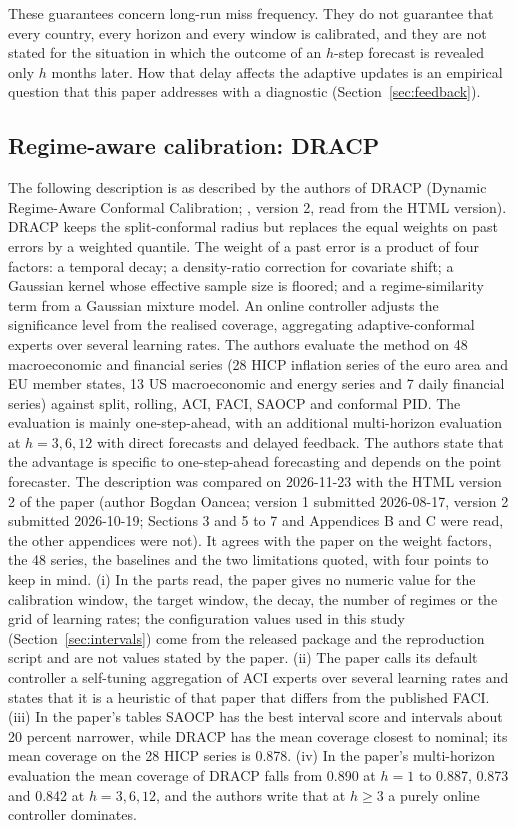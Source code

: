 These guarantees concern long-run miss frequency. They do not guarantee that every country, every horizon and every window is calibrated, and they are not stated for the situation in which the outcome of an $h$-step forecast is revealed only $h$ months later. How that delay affects the adaptive updates is an empirical question that this paper addresses with a diagnostic (Section~\ref{sec:feedback}).

\subsection{Regime-aware calibration: DRACP}

The following description is as described by the authors of DRACP (Dynamic Regime-Aware Conformal Calibration; \citealp{oancea2026dracp}, version 2, read from the HTML version). DRACP keeps the split-conformal radius but replaces the equal weights on past errors by a weighted quantile. The weight of a past error is a product of four factors: a temporal decay; a density-ratio correction for covariate shift; a Gaussian kernel whose effective sample size is floored; and a regime-similarity term from a Gaussian mixture model. An online controller adjusts the significance level from the realised coverage, aggregating adaptive-conformal experts over several learning rates. The authors evaluate the method on 48 macroeconomic and financial series (28 HICP inflation series of the euro area and EU member states, 13 US macroeconomic and energy series and 7 daily financial series) against split, rolling, ACI, FACI, SAOCP and conformal PID. The evaluation is mainly one-step-ahead, with an additional multi-horizon evaluation at $h=3,6,12$ with direct forecasts and delayed feedback. The authors state that the advantage is specific to one-step-ahead forecasting and depends on the point forecaster. The description was compared on 2026-11-23 with the HTML version 2 of the paper (author Bogdan Oancea; version 1 submitted 2026-08-17, version 2 submitted 2026-10-19; Sections 3 and 5 to 7 and Appendices B and C were read, the other appendices were not). It agrees with the paper on the weight factors, the 48 series, the baselines and the two limitations quoted, with four points to keep in mind. (i) In the parts read, the paper gives no numeric value for the calibration window, the target window, the decay, the number of regimes or the grid of learning rates; the configuration values used in this study (Section~\ref{sec:intervals}) come from the released package and the reproduction script and are not values stated by the paper. (ii) The paper calls its default controller a self-tuning aggregation of ACI experts over several learning rates and states that it is a heuristic of that paper that differs from the published FACI. (iii) In the paper's tables SAOCP has the best interval score and intervals about 20 percent narrower, while DRACP has the mean coverage closest to nominal; its mean coverage on the 28 HICP series is 0.878. (iv) In the paper's multi-horizon evaluation the mean coverage of DRACP falls from 0.890 at $h=1$ to 0.887, 0.873 and 0.842 at $h=3,6,12$, and the authors write that at $h\ge 3$ a purely online controller dominates.

